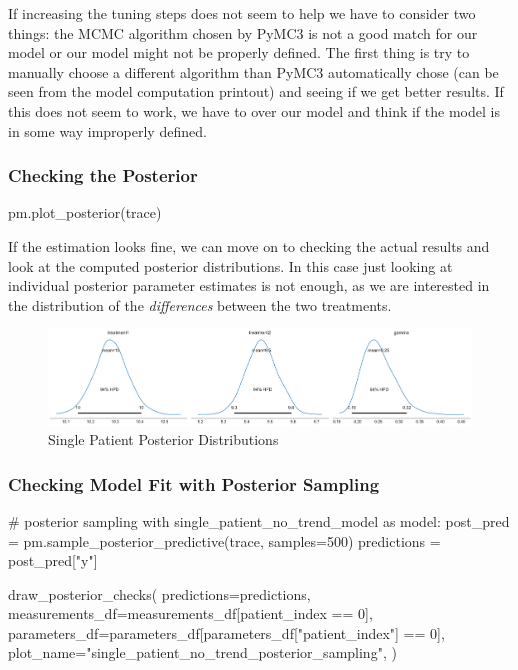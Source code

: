 \documentclass[12pt,a4paper,leqno]{report}
\theoremstyle{plain}
\theoremstyle{definition}
\theoremstyle{remark}
\begin{document}
If increasing the tuning steps does not seem to help we have to consider two things: the
MCMC algorithm chosen by PyMC3 is not a good match for our model or our model might not
be properly defined. The first thing is try to manually choose a different algorithm than
PyMC3 automatically chose (can be seen from the model computation printout) and seeing
if we get better results. If this does not seem to work, we have to over our model and
think if the model is in some way improperly defined.


\bigskip
\subsubsection{Checking the Posterior}
\begin{pyverbatim}
pm.plot_posterior(trace)
\end{pyverbatim}
\bigskip

If the estimation looks fine, we can move on to checking the actual results and look at
the computed posterior distributions. In this case just looking at individual
posterior parameter estimates is not enough, as we are interested in the distribution of
the \emph{differences} between the two treatments.


\begin{figure}[!h]
    \caption{Single Patient Posterior Distributions}
    \includegraphics[width=\textwidth,height=\textheight,keepaspectratio]{single_patient_no_trend_posteriors.pdf}
\end{figure}


\subsubsection{Checking Model Fit with Posterior Sampling}

\bigskip
\begin{pyverbatim}
# posterior sampling
with single_patient_no_trend_model as model:
    post_pred = pm.sample_posterior_predictive(trace, samples=500)
    predictions = post_pred["y"]

draw_posterior_checks(
    predictions=predictions,
    measurements_df=measurements_df[patient_index == 0],
    parameters_df=parameters_df[parameters_df["patient_index"] == 0],
    plot_name="single_patient_no_trend_posterior_sampling",
)
\end{pyverbatim}
\bigskip
\end{document}
